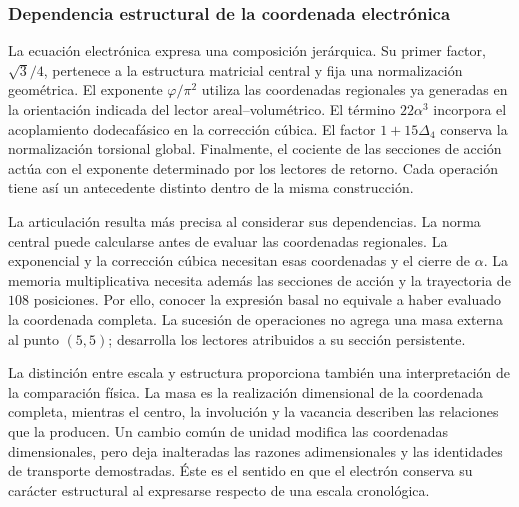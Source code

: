 \subsubsection{Dependencia estructural de la coordenada electrónica}

La ecuación electrónica expresa una composición jerárquica. Su primer
factor, \(\sqrt3/4\), pertenece a la estructura matricial central y fija
una normalización geométrica. El exponente \(\varphi/\pi^2\) utiliza las
coordenadas regionales ya generadas en la orientación indicada del lector
areal--volumétrico. El término \(22\alpha^3\) incorpora el acoplamiento
dodecafásico en la corrección cúbica. El factor \(1+15\Delta_4\) conserva
la normalización torsional global. Finalmente, el cociente de las secciones
de acción actúa con el exponente determinado por los lectores de retorno.
Cada operación tiene así un antecedente distinto dentro de la misma
construcción.

La articulación resulta más precisa al considerar sus dependencias.
La norma central puede calcularse antes de evaluar las coordenadas
regionales. La exponencial y la corrección cúbica necesitan esas
coordenadas y el cierre de \(\alpha\). La memoria multiplicativa necesita
además las secciones de acción y la trayectoria de \(108\) posiciones.
Por ello, conocer la expresión basal no equivale a haber evaluado la
coordenada completa. La sucesión de operaciones no agrega una masa
externa al punto \((5,5)\); desarrolla los lectores atribuidos a su
sección persistente.

La distinción entre escala y estructura proporciona también una
interpretación de la comparación física. La masa es la realización
dimensional de la coordenada completa, mientras el centro, la involución
y la vacancia describen las relaciones que la producen. Un cambio común
de unidad modifica las coordenadas dimensionales, pero deja inalteradas
las razones adimensionales y las identidades de transporte demostradas.
Éste es el sentido en que el electrón conserva su carácter estructural
al expresarse respecto de una escala cronológica.
